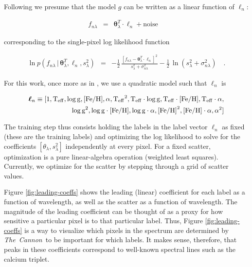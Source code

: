 \documentclass[12pt, preprint]{aastex}
\newcommand{\tc}{\textsl{The~Cannon}}
\newcommand{\set}[1]{\bm{#1}}
\newcommand{\teff}{\mbox{$\rm T_{eff}$}}
\newcommand{\feh}{\mbox{$\rm [Fe/H]$}}
\newcommand{\logg}{\mbox{$\rm \log g$}}
\newcommand{\starlabel}{\ell}
\newcommand{\starlabelvec}{\set{\starlabel}}
\newcommand{\given}{\,|\,}
\begin{document}
Following \citet{ness2015} we presume that the model $g$ can be written 
 as a linear function of $\starlabelvec_n$: 

\begin{eqnarray}
f_{n\lambda} &=&
\set{\theta}_\lambda^T \cdot \starlabelvec_n + \mbox{noise}
\label{eq:linearmodel}\quad
\end{eqnarray}

\noindent corresponding to the single-pixel log likelihood function

\begin{eqnarray}
\ln p(f_{n\lambda}\given\set{\theta}^T_\lambda, \starlabelvec_n, s_\lambda^2) &=&
 -\frac{1}{2}\,\frac{[f_{n\lambda} - \set{\theta}^T_\lambda \cdot \starlabelvec_n]^2}{s_\lambda^2 + \sigma_{n\lambda}^2}
 -\frac{1}{2}\,\ln(s_\lambda^2 + \sigma_{n\lambda}^2)
\label{eq:like}\quad.
\end{eqnarray}

\noindent For this work, once more as in \citet{ness2015}, 
we use a quadratic model such that $\starlabelvec_n$ is  

\begin{equation}
\begin{split}
\starlabelvec_n \equiv [1, \teff, \logg, \feh, \alpha, \teff^2, \teff\cdot\logg, \teff\cdot\feh, \teff\cdot\alpha, \\
\logg^2, \logg\cdot\feh, \logg\cdot\alpha, \feh^2, \feh\cdot\alpha, \alpha^2]
\label{eq:quadinthreelabels}
\end{split}
\end{equation}

The training step thus consists holding the labels in the label vector 
$\starlabelvec_n$ as fixed (these are the training labels) and optimizing the 
log likelihood to solve for the coefficients 
$[\theta_\lambda, s_\lambda^2]$ independently at every pixel. 
For a fixed scatter, optimization is a pure linear-algebra operation
(weighted least squares). Currently, we optimize for the scatter by stepping through
a grid of scatter values. 

Figure \ref{fig:leading-coeffs} shows the leading (linear) coefficient for each label as
a function of wavelength, as well as the scatter as a function of wavelength.
The magnitude of the leading coefficient can be thought of as a proxy for how 
sensitive a particular pixel is to that particular label. Thus, Figure \ref{fig:leading-coeffs}
is a way to visualize which pixels in the spectrum are determined by \tc\ to be
important for which labels. It makes sense, therefore, that peaks in these coefficients
correspond to well-known spectral lines such as the calcium triplet. 
\end{document}
